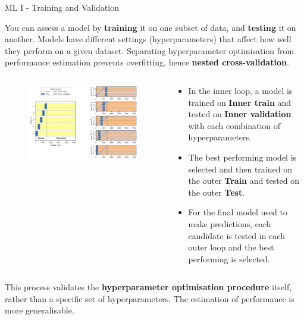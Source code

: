 \documentclass[9pt]{beamer}
\begin{document}
\begin{frame}{ML I - Training and Validation}

\small

You can assess a model by \textbf{training} it on one subset of data, and \textbf{testing} it on another. Models have different settings (hyperparameters) that affect how well they perform on a given dataset. Separating hyperparameter optimisation from performance estimation prevents overfitting, hence \textbf{nested cross-validation}.
		
\begin{columns}
	\begin{column}{0.618\linewidth}
	\begin{figure}
		\includegraphics[width=\linewidth]{../figures/si_figure_2.pdf}
	\end{figure}
	\end{column}

	\begin{column}{0.382\linewidth}
		\begin{itemize}
			\item In the inner loop, a model is trained on \textbf{Inner train} and tested on \textbf{Inner validation} with each combination of hyperparameters. 
			\item The best performing model is selected and then trained on the outer \textbf{Train} and tested on the outer \textbf{Test}. 
			\item For the final model used to make predictions, each candidate is tested in each outer loop and the best performing is selected.
		\end{itemize}

	\end{column}
\end{columns}

\medskip

This process validates the \textbf{hyperparameter optimisation procedure} itself, rather than a specific set of hyperparameters. The estimation of performance is more generalisable.

\end{frame}
\end{document}
